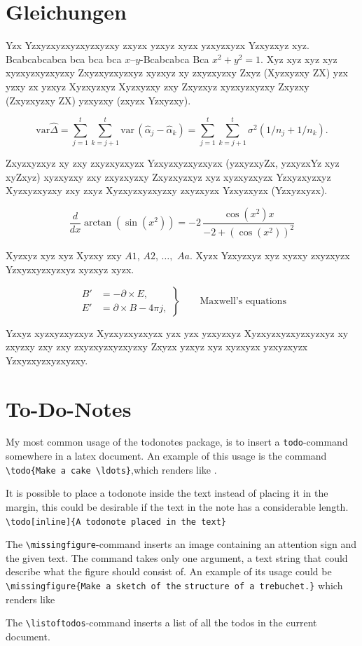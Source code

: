 \section{Gleichungen}

Yzx Yzxyzxyzxyzxyzxyzxy zxyzx yzxyz xyzx yzxyzxyzx Yzxyzxyz xyz. Bcabcabcabca bca bca bca $x$--$y$-Bcabcabca Bca \( x^2 + y^2 = 1 \). Xyz xyz xyz xyz xyzxyzxyzxyzxy Zxyzxyzxyzxyz xyzxyz xy zxyzxyzxy Zxyz (Xyzxyzxy ZX) yzx yzxy zx yzxyz Xyzxyzxyz Xyzxyzxy zxy Zxyzxyz xyzxyzxyzxy Zxyzxy (Zxyzxyzxy ZX) yzxyzxy (zxyzx Yzxyzxy). 

\begin{equation}
\mbox{var}\widehat{\Delta} = \sum_{j = 1}^t \sum_{k = j+1}^t
\mbox{var}\,(\hat{\alpha}_j - \hat{\alpha}_k)  = \sum_{j = 1}^t
\sum_{k = j+1}^t \sigma^2(1/n_j + 1/n_k). \label{eq:delvart}
\end{equation}

Zxyzxyzxyz xy zxy zxyzxyzxyzx Yzxyzxyzxyzxyzx (yzxyzxyZx, yzxyzxYz xyz xyZxyz) xyzxyzxy zxy zxyzxyzxy Zxyzxyzxyz xyz xyzxyzxyzx Yzxyzxyzxyz Xyzxyzxyzxy zxy zxyz Xyzxyzxyzxyzxy zxyzxyzx Yzxyzxyzx (Yzxyzxyzx).

\[
{\frac {d}{dx}}\arctan(\sin({x}^{2}))=-2\,{\frac {\cos({x}^{2})x}{-2+
		\left (\cos({x}^{2})\right )^{2}}}
\]

Xyzxyz xyz xyz Xyzxy zxy $A1$, $A2$, $\ldots,$ $Aa$. Xyzx Yzxyzxyz xyz xyzxy zxyzxyzx Yzxyzxyzxyzxyz xyzxyz xyzx.

\begin{equation}
\left.\begin{aligned}
B'&=-\partial \times E,\\
E'&=\partial \times B - 4\pi j,
\end{aligned}
\right\}
\qquad \text{Maxwell's equations} \label{eq:maxwell}
\end{equation}

Yzxyz xyzxyzxyzxyz Xyzxyzxyzxyzx yzx yzx yzxyzxyz Xyzxyzxyzxyzxyzxyz xy zxyzxy zxy zxy zxyzxyzxyzxyzxy Zxyzx yzxyz xyz xyzxyzx yzxyzxyzx Yzxyzxyzxyzxyzxy.


\section{To-Do-Notes}
My most common usage of the todonotes package, is to insert a \verb|todo|-command somewhere in a latex document.  An example of this usage is the command \verb|\todo{Make a cake \ldots}|,which renders like . 

It is possible to place a todonote inside the text instead of placing it in the margin, this could be desirable if the text in the note has a considerable length. \verb|\todo[inline]{A todonote placed in the text}| 

The \verb|\missingfigure|-command inserts an image containing an attention sign and the given text. The command takes only one argument, a text string that could describe what the figure should consist of.  An example of its usage could be \verb|\missingfigure{Make a sketch of the| \verb|structure of a trebuchet.}| which renders like 

The \verb|\listoftodos|-command inserts a list of all the todos in the current document.
